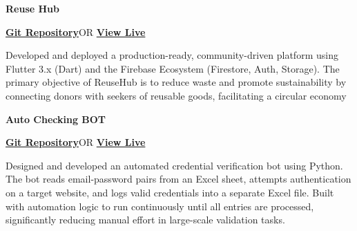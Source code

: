 \documentclass[a4paper]{article}
\begin{document}
    
    \begin{minipage}{0.6\textwidth}
        \begin{flushleft}
            \textbf{\large Reuse Hub}
        \end{flushleft}
    \end{minipage}
    \begin{minipage}{0.4\textwidth}
        \begin{flushright}
           \href{https://github.com/pronad1/Flutter/tree/main/software}{\textbf{\faGithub \hspace{0.1cm} Git Repository}}OR \href{https://youtu.be/6uswFRk_Srs?si=awg9g7EszyJBDZAi}{\textbf{\faPaperPlane\hspace{0.1cm}View Live}}
        \end{flushright}
    \end{minipage}
    Developed and deployed a production-ready, community-driven platform using Flutter 3.x (Dart) and the Firebase Ecosystem (Firestore, Auth, Storage). The primary objective of ReuseHub is to reduce waste and promote sustainability by connecting donors with seekers of reusable goods, facilitating a circular economy


    
    \vspace{4pt}
    \begin{minipage}{0.6\textwidth}
        \begin{flushleft}
            \textbf{\large Auto Checking BOT}
        \end{flushleft}
    \end{minipage}
    \begin{minipage}{0.4\textwidth}
        \begin{flushright}
           \href{https://github.com/pronad1/Auto_Checking_Bot}{\textbf{\faGithub \hspace{0.1cm} Git Repository}}OR \href{https://youtu.be/09_ODw0Iv0w?si=wiLA8LsC7KXs0wKv}{\textbf{\faPaperPlane\hspace{0.1cm}View Live}}
        \end{flushright}
    \end{minipage}
    Designed and developed an automated credential verification bot using Python. The bot reads email-password pairs from an Excel sheet, attempts authentication on a target website, and logs valid credentials into a separate Excel file. Built with automation logic to run continuously until all entries are processed, significantly reducing manual effort in large-scale validation tasks.
\end{document}
